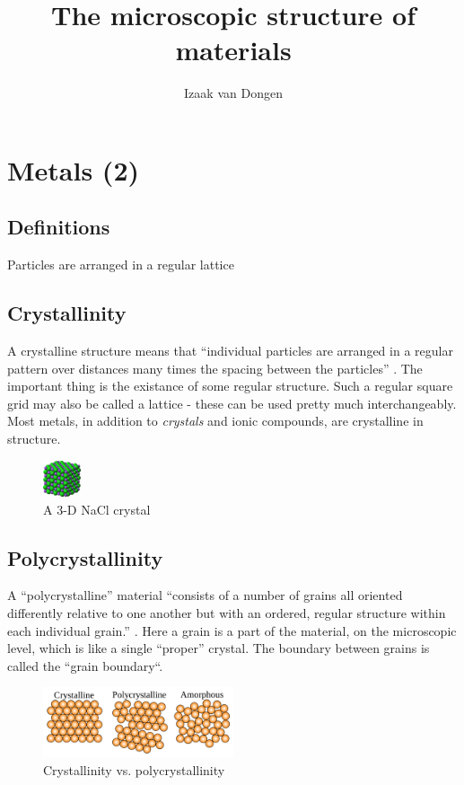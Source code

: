 \documentclass{article}
\title{The microscopic structure of materials}
\author{Izaak van Dongen}
\begin{document}
    \section{Metals (2)}
    \subsection{Definitions}
	\begin{mdframed}[backgroundcolor = gray!30,
		frametitle = Crystalline]
		Particles are arranged in a regular lattice
	\end{mdframed}
    \subsection{Crystallinity}
    A crystalline structure means that ``individual particles are arranged in a
    regular pattern over distances many times the spacing between the
    particles'' \cite[p.~96]{OCRPhysics}. The important thing is the existance
    of some regular structure. Such a regular square grid may also be called a
    lattice - these can be used pretty much interchangeably. Most metals, in
    addition to \textit{crystals} and ionic compounds, are crystalline in
    structure.
    \begin{figure}[h]
        \includegraphics[width=0.1\textwidth]{crystal}
        \centering
        \caption{A 3-D NaCl crystal}
    \end{figure}
    \subsection{Polycrystallinity}
    A ``polycrystalline'' material ``consists of a number of grains all
    oriented differently relative to one another but with an ordered, regular
    structure within each individual grain.'' \cite[p.~98]{OCRPhysics}. Here a
    grain is a part of the material, on the microscopic level, which is like a
    single ``proper'' crystal. The boundary between grains is called the
    ``grain boundary``.
    \begin{figure}[h]
        \includegraphics[width=0.5\textwidth]{crystal_and_poly}
        \centering
        \caption{Crystallinity vs. polycrystallinity}
    \end{figure}
\end{document}
